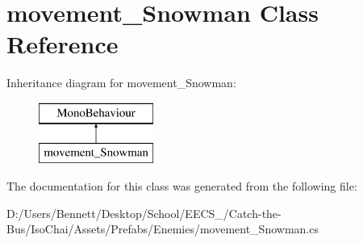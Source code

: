 \hypertarget{classmovement___snowman}{}\section{movement\+\_\+\+Snowman Class Reference}
\label{classmovement___snowman}
Inheritance diagram for movement\+\_\+\+Snowman\+:\begin{figure}[H]
\begin{center}
\leavevmode
\includegraphics[height=2.000000cm]{classmovement___snowman}
\end{center}
\end{figure}


The documentation for this class was generated from the following file\+:\begin{DoxyCompactItemize}
\item 
D\+:/\+Users/\+Bennett/\+Desktop/\+School/\+E\+E\+C\+S\+\_/\+Catch-\/the-\/\+Bus/\+Iso\+Chai/\+Assets/\+Prefabs/\+Enemies/movement\+\_\+\+Snowman.\+cs\end{DoxyCompactItemize}
